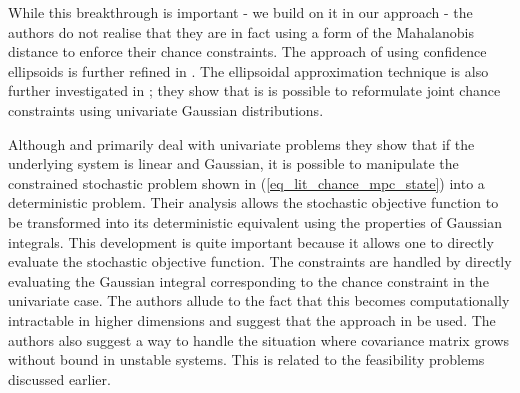 While this breakthrough is important - we build on it in our approach - the authors do not realise that they are in fact using a form of the Mahalanobis distance to enforce their chance constraints. The approach of using confidence ellipsoids is further refined in \cite{cannon}. The ellipsoidal approximation technique is also further investigated in \cite{blackmore2}; they show that is is possible to reformulate joint chance constraints using univariate Gaussian distributions.

Although \cite{yan1} and \cite{yan2} primarily deal with univariate problems they show that if the underlying system is linear and Gaussian, it is possible to manipulate the constrained stochastic problem shown in (\ref{eq_lit_chance_mpc_state}) into a deterministic problem. Their analysis allows the stochastic objective function to be transformed into its deterministic equivalent using the properties of Gaussian integrals. This development is quite important because it allows one to directly evaluate the stochastic objective function. The constraints are handled by directly evaluating the Gaussian integral corresponding to the chance constraint in the univariate case. The authors allude to the fact that this becomes computationally intractable in higher dimensions and suggest that the approach in \cite{vanhessem2} be used. The authors also suggest a way to handle the situation where covariance matrix grows without bound in unstable systems. This is related to the feasibility problems discussed earlier.

